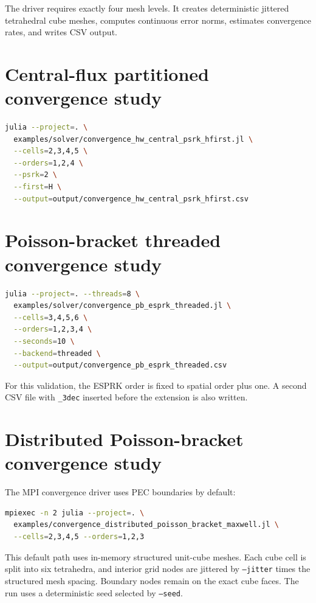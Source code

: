 \documentclass[11pt,oneside]{book}
\newcommand{\code}[1]{\texttt{#1}}
\begin{document}
The driver requires exactly four mesh levels. It creates deterministic
jittered tetrahedral cube meshes, computes continuous error norms, estimates
convergence rates, and writes CSV output.

\section{Central-flux partitioned convergence study}

\begin{lstlisting}[language=bash]
julia --project=. \
  examples/solver/convergence_hw_central_psrk_hfirst.jl \
  --cells=2,3,4,5 \
  --orders=1,2,4 \
  --psrk=2 \
  --first=H \
  --output=output/convergence_hw_central_psrk_hfirst.csv
\end{lstlisting}

\section{Poisson-bracket threaded convergence study}

\begin{lstlisting}[language=bash]
julia --project=. --threads=8 \
  examples/solver/convergence_pb_esprk_threaded.jl \
  --cells=3,4,5,6 \
  --orders=1,2,3,4 \
  --seconds=10 \
  --backend=threaded \
  --output=output/convergence_pb_esprk_threaded.csv
\end{lstlisting}

For this validation, the ESPRK order is fixed to spatial order plus one. A
second CSV file with \code{\_3dec} inserted before the extension is also
written.

\section{Distributed Poisson-bracket convergence study}

The MPI convergence driver uses PEC boundaries by default:
\begin{lstlisting}[language=bash]
mpiexec -n 2 julia --project=. \
  examples/convergence_distributed_poisson_bracket_maxwell.jl \
  --cells=2,3,4,5 --orders=1,2,3
\end{lstlisting}
This default path uses in-memory structured unit-cube meshes. Each cube cell
is split into six tetrahedra, and interior grid nodes are jittered by
\code{--jitter} times the structured mesh spacing. Boundary nodes remain on
the exact cube faces. The run uses a deterministic seed selected by
\code{--seed}.
\end{document}
